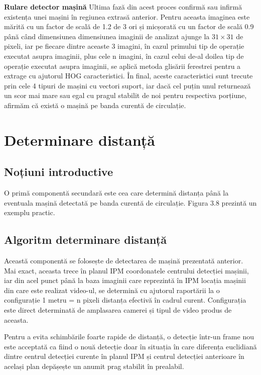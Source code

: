 \textbf{Rulare detector mașină}
Ultima fază din acest proces confirmă sau infirmă existența unei mașini în regiunea extrasă anterior. Pentru aceasta imaginea este mărită cu un factor de scală de 1.2 de 3 ori și micșorată cu un factor de scală 0.9 până când dimensiunea dimensiunea imaginii de analizat ajunge la $31 \times 31$ de pixeli, iar pe fiecare dintre aceaste 3 imagini, în cazul primului tip de operație executat asupra imaginii, plus cele n imagini, în cazul celui de-al doilea tip de operație executat asupra imaginii, se aplică metoda glisării ferestrei pentru a extrage cu ajutorul HOG caracteristici. În final, aceste caracteristici sunt trecute prin cele 4 tipuri de mașini cu vectori suport, iar dacă cel puțin unul returnează un scor mai mare sau egal cu pragul stabilit de noi pentru respectiva porțiune, afirmăm că există o mașină pe banda curentă de circulație.

\section{Determinare distanță}
\subsection{Noțiuni introductive}

O primă componentă secundară este cea care determină distanța până la eventuala mașină detectată pe banda curentă de circulație. Figura 3.8 prezintă un exemplu practic.

\subsection{Algoritm determinare distanță}

Această componentă se folosește de detectarea de mașină prezentată anterior. Mai exact, aceasta trece în planul IPM coordonatele centrului detecției mașinii, iar din acel punct până la baza imaginii care reprezintă în IPM locația mașinii din care este realizat video-ul, se determină cu ajutorul raportării la o configurație 1 metru = n pixeli distanța efectivă în cadrul curent. Configurația este direct determinată de amplasarea camerei și tipul de video produs de aceasta. 

Pentru a evita schimbările foarte rapide de distanță, o detecție într-un frame nou este acceptată ca fiind o nouă detecție doar în situația în care diferența euclidiană dintre centrul detecției curente în planul IPM și centrul detecției anterioare în același plan depășește un anumit prag stabilit în prealabil.

